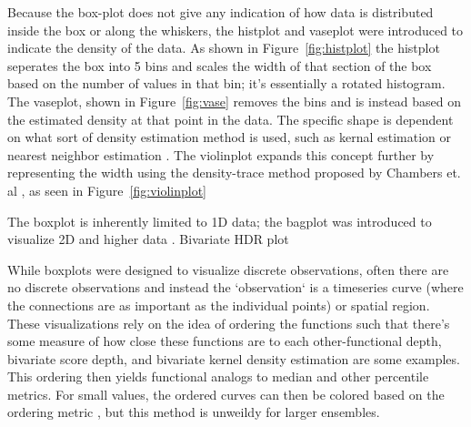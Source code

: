 \begin{figure}
\label{fig:histplot}
\label{fig:vase}
\label{fig:violin}
\end{figure}

Because the box-plot does not give any indication of how data is distributed
inside the box or along the whiskers, the histplot and vaseplot were introduced to indicate
the density of the data\cite{benjamini1988}. As shown in
Figure~\ref{fig:histplot} the histplot seperates the box
into  5 bins and scales the width of that section of the box based on the
number of values in that bin; it's essentially a rotated histogram. The
vaseplot, shown in Figure~\ref{fig:vase} removes the bins and is instead based
on the estimated density at that point in the data. The specific shape is
dependent on what sort of density estimation method is used, such as kernal
estimation or nearest neighbor estimation \cite{chambers1983}. The
violinplot \cite{hintz1998} expands this concept further by representing the
width using the density-trace method proposed by Chambers
et. al \cite{chambers1983}, as seen in Figure~\ref{fig:violinplot}%



\begin{figure}
\end{figure}
The boxplot is inherently limited to 1D data; the bagplot was introduced to
visualize 2D and higher data \cite{roussow1999}.
Bivariate HDR plot \cite{Hyndman1996}

While boxplots were designed to visualize discrete observations, often there
are no discrete observations and instead the `observation` is a timeseries
curve (where the connections are as important as the individual points) or
spatial region. These visualizations rely on the idea of ordering the
functions such that there's some measure of how close these functions are to
each other-functional depth\cite{fabrero2007}, bivariate score depth\cite{Hyndman2009}, and
bivariate kernel density estimation\cite{scott92} are some examples. This
ordering then yields functional analogs to median and other percentile
metrics. For small values, the ordered curves can then be colored based on the
ordering metric \cite{Hyndman2009}, but this method is unweildy for larger
ensembles.

